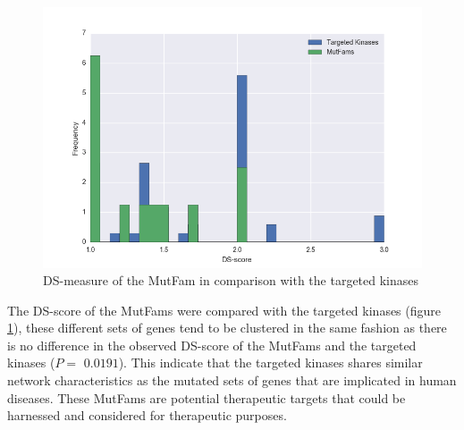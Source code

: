 \documentclass[a4paper, 11pt]{article}
\begin{document}
\begin{figure}[H]
	\includegraphics[width=\linewidth]{figures/muttarg.png}
	\centering
	\caption{DS-measure of the MutFam in comparison with the targeted kinases}
	\label{muttarg}
\end{figure}
The DS-score of the MutFams were compared with the targeted kinases (figure \ref{muttarg}), these different sets of genes tend to be clustered in the same fashion as there is no difference in the observed DS-score of the MutFams and the targeted kinases ($P=$ $0.0191$). This indicate that the targeted kinases shares similar network characteristics as the mutated sets of genes that are implicated in human diseases. These MutFams are potential therapeutic targets that could be harnessed and considered for therapeutic purposes.
\end{document}
